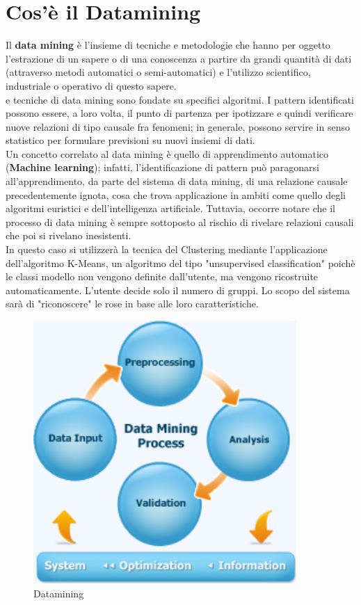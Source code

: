\documentclass[a4paper, oneside]{book}
\begin{document}
\section*{Cos'è il Datamining}
Il \textbf{data mining} è l'insieme di tecniche e metodologie che hanno per oggetto l'estrazione di un sapere o di una conoscenza a partire da grandi quantità di dati (attraverso metodi automatici o semi-automatici) e l'utilizzo scientifico, industriale o operativo di questo sapere. \\
e tecniche di data mining sono fondate su specifici algoritmi. I pattern identificati possono essere, a loro volta, il punto di partenza per ipotizzare e quindi verificare nuove relazioni di tipo causale fra fenomeni; in generale, possono servire in senso statistico per formulare previsioni su nuovi insiemi di dati.\\
Un concetto correlato al data mining è quello di apprendimento automatico (\textbf{Machine learning}); infatti, l'identificazione di pattern può paragonarsi all'apprendimento, da parte del sistema di data mining, di una relazione causale precedentemente ignota, cosa che trova applicazione in ambiti come quello degli algoritmi euristici e dell'intelligenza artificiale. Tuttavia, occorre notare che il processo di data mining è sempre sottoposto al rischio di rivelare relazioni causali che poi si rivelano inesistenti.\\
In questo caso si utilizzerà la tecnica del Clustering mediante l'applicazione dell'algoritmo K-Means, un algoritmo del tipo "unsupervised classification" poichè le classi modello non vengono definite dall'utente, ma vengono ricostruite automaticamente. L'utente decide solo il numero di gruppi. Lo scopo del sistema sarà di "riconoscere" le rose in base alle loro caratteristiche.
\begin{figure}[htp]
\centering
\includegraphics[width=10cm]{datamining.jpg}
\caption{Datamining}
\label{fig:Datamining}
\end{figure}
\end{document}
